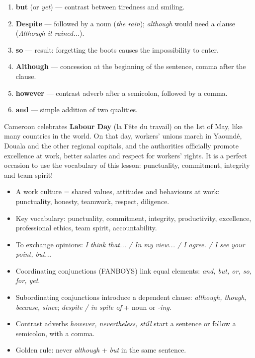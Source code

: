 \documentclass[11pt]{article}
\newcommand{\cle}[1]{{\popxbold\color{popdark}#1}}
\begin{document}
\begin{corrige}[Exercice 1]
\begin{enumerate}
\item \textbf{but} (or \emph{yet}) --- contrast between tiredness and smiling.
\item \textbf{Despite} --- followed by a noun (\emph{the rain}); \emph{although} would need a clause (\emph{Although it rained...}).
\item \textbf{so} --- result: forgetting the boots causes the impossibility to enter.
\item \textbf{Although} --- concession at the beginning of the sentence, comma after the clause.
\item \textbf{however} --- contrast adverb after a semicolon, followed by a comma.
\item \textbf{and} --- simple addition of two qualities.
\end{enumerate}
\end{corrige}

\begin{savaistu}
Cameroon celebrates \textbf{Labour Day} (la Fête du travail) on the 1st of May, like many countries in the world. On that day, workers' unions march in Yaoundé, Douala and the other regional capitals, and the authorities officially promote \cle{excellence at work}, better salaries and respect for workers' rights. It is a perfect occasion to use the vocabulary of this lesson: punctuality, commitment, integrity and team spirit!
\end{savaistu}

\begin{aretenir}
\begin{itemize}
\item A \cle{work culture} = shared values, attitudes and behaviours at work: punctuality, honesty, teamwork, respect, diligence.
\item Key vocabulary: punctuality, commitment, integrity, productivity, excellence, professional ethics, team spirit, accountability.
\item To exchange opinions: \emph{I think that... / In my view... / I agree. / I see your point, but...}
\item Coordinating conjunctions (FANBOYS) link equal elements: \emph{and, but, or, so, for, yet}.
\item Subordinating conjunctions introduce a dependent clause: \emph{although, though, because, since}; \emph{despite / in spite of} + noun or \emph{-ing}.
\item Contrast adverbs \emph{however, nevertheless, still} start a sentence or follow a semicolon, with a comma.
\item Golden rule: never \emph{although} + \emph{but} in the same sentence.
\end{itemize}
\end{aretenir}
\end{document}
